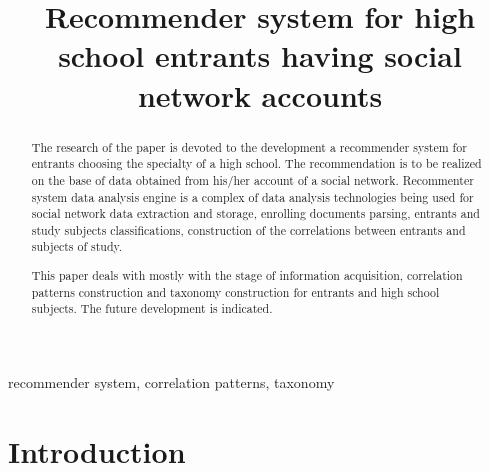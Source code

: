 \documentclass[conference]{IEEEtran}
\begin{document}
\title{Recommender system for high school entrants having social network accounts}

\author{%
}

\maketitle

\begin{abstract}
  The research of the paper is devoted to the development a recommender system for entrants choosing the specialty of a high school.  The recommendation is to be realized on the base of data obtained from his/her account of a social network.  Recommenter system data analysis engine is a complex of data analysis technologies being used for social network data extraction and storage, enrolling documents parsing, entrants and study subjects classifications, construction of the correlations between entrants and subjects of study.

  This paper deals with mostly with the stage of information acquisition, correlation patterns construction and taxonomy construction for entrants and high school subjects.  The future development is indicated.
\end{abstract}

\begin{IEEEkeywords}
recommender system, correlation patterns, taxonomy
\end{IEEEkeywords}

\section{Introduction}
\end{document}
